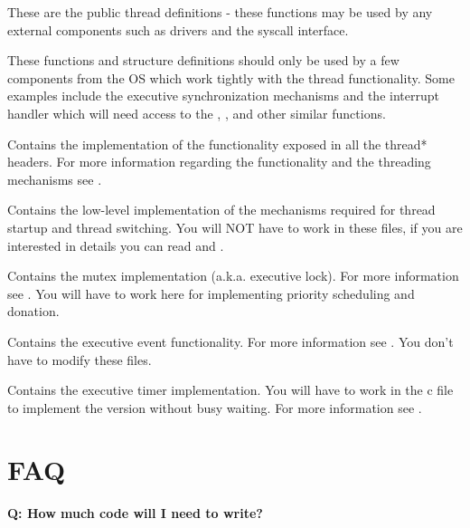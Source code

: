 
These are the public thread definitions - these functions may be used by any external components
such as drivers and the syscall interface.


These functions and structure definitions should only be used by a few components from the OS which
work tightly with the thread functionality. Some examples include the executive synchronization
mechanisms and the interrupt handler which will need access to the ,
,  and other similar functions.


Contains the implementation of the functionality exposed in all the thread* headers. For more
information regarding the functionality and the threading mechanisms see .


Contains the low-level implementation of the mechanisms required for thread startup and thread
switching. You will NOT have to work in these files, if you are interested in details you can read
 and .



Contains the mutex implementation (a.k.a. executive lock). For more information see 
. You will have to work here for implementing priority scheduling and donation.



Contains the executive event functionality. For more information see . You
don't have to modify these files.



Contains the executive timer implementation. You will have to work in the c file to implement the
version without busy waiting. For more information see .

\section{FAQ}

\textbf{Q: How much code will I need to write?}


